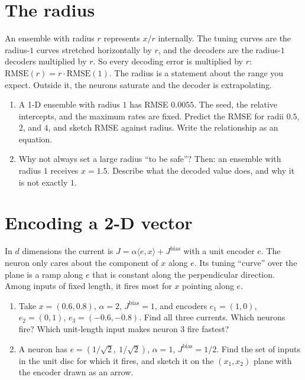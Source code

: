 \documentclass[11pt,letterpaper]{article}
\newcommand{\Jb}{J^{\mathrm{bias}}}
\begin{document}
\section{The radius}

\begin{idea}
An ensemble with radius $r$ represents $x/r$ internally. The tuning curves are the radius-$1$ curves stretched horizontally by $r$, and the decoders are the radius-$1$ decoders multiplied by $r$. So every decoding error is multiplied by $r$: $\mathrm{RMSE}(r) = r\cdot\mathrm{RMSE}(1)$. The radius is a statement about the range you expect. Outside it, the neurons saturate and the decoder is extrapolating.
\end{idea}

\begin{enumerate}
\item A 1-D ensemble with radius $1$ has RMSE $0.0055$. The seed, the relative intercepts, and the maximum rates are fixed. Predict the RMSE for radii $0.5$, $2$, and $4$, and sketch RMSE against radius. Write the relationship as an equation.
\item Why not always set a large radius ``to be safe''? Then: an ensemble with radius $1$ receives $x = 1.5$. Describe what the decoded value does, and why it is not exactly $1$.
\end{enumerate}

\section{Encoding a 2-D vector}

\begin{idea}
In $d$ dimensions the current is $J = \alpha\langle e, x\rangle + \Jb$ with a unit encoder $e$. The neuron only cares about the component of $x$ along $e$. Its tuning ``curve'' over the plane is a ramp along $e$ that is constant along the perpendicular direction. Among inputs of fixed length, it fires most for $x$ pointing along $e$.
\end{idea}

\begin{enumerate}
\item Take $x = (0.6, 0.8)$, $\alpha = 2$, $\Jb = 1$, and encoders $e_1 = (1, 0)$, $e_2 = (0, 1)$, $e_3 = (-0.6, -0.8)$. Find all three currents. Which neurons fire? Which unit-length input makes neuron 3 fire fastest?
\item A neuron has $e = (1/\sqrt2,\ 1/\sqrt2)$, $\alpha = 1$, $\Jb = 1/2$. Find the set of inputs in the unit disc for which it fires, and sketch it on the $(x_1, x_2)$ plane with the encoder drawn as an arrow.
\end{enumerate}
\end{document}
